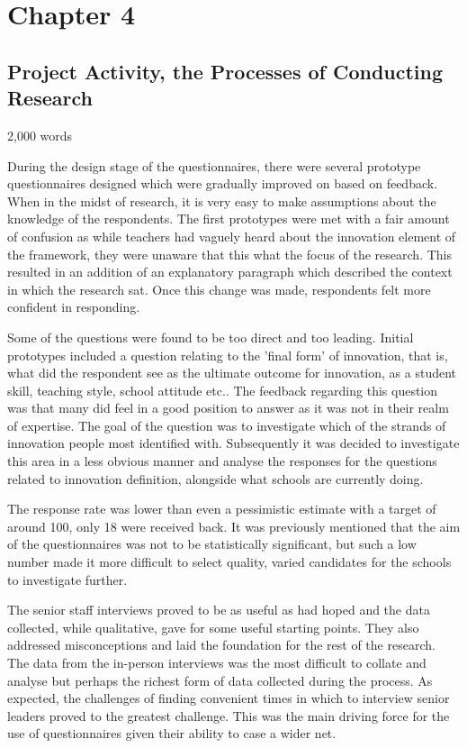 \documentclass[11pt]{article}
\begin{document}
\section{Chapter 4}
\subsection{Project Activity, the Processes of Conducting Research}
2,000 words 

During the design stage of the questionnaires, there were several prototype questionnaires designed which were gradually improved on based on feedback. When in the midst of research, it is very easy to make assumptions about the knowledge of the respondents. The first prototypes were met with a fair amount of confusion as while teachers had vaguely heard about the innovation element of the framework, they were unaware that this what the focus of the research. This resulted in an addition of an explanatory paragraph which described the context in which the research sat. Once this change was made, respondents felt more confident in responding.

Some of the questions were found to be too direct and too leading. Initial prototypes included a question relating to the 'final form' of innovation, that is, what did the respondent see as the ultimate outcome for innovation, as a student skill, teaching style, school attitude etc.. The feedback regarding this question was that many did feel in a good position to answer as it was not in their realm of expertise. The goal of the question was to investigate which of the strands of innovation people most identified with. Subsequently it was decided to investigate this area in a less obvious manner and analyse the responses for the questions related to innovation definition, alongside what schools are currently doing.

The response rate was lower than even a pessimistic estimate with a target of around 100, only 18 were received back. It was previously mentioned that the aim of the questionnaires was not to be statistically significant, but such a low number made it more difficult to select quality, varied candidates for the schools to investigate further.

The senior staff interviews proved to be as useful as had hoped and the data collected, while qualitative, gave for some useful starting points. They also addressed misconceptions and laid the foundation for the rest of the research. The data from the in-person interviews was the most difficult to collate and analyse but perhaps the richest form of data collected during the process. As expected, the challenges of finding convenient times in which to interview senior leaders proved to the greatest challenge. This was the main driving force for the use of questionnaires given their ability to case a wider net. 
\end{document}
